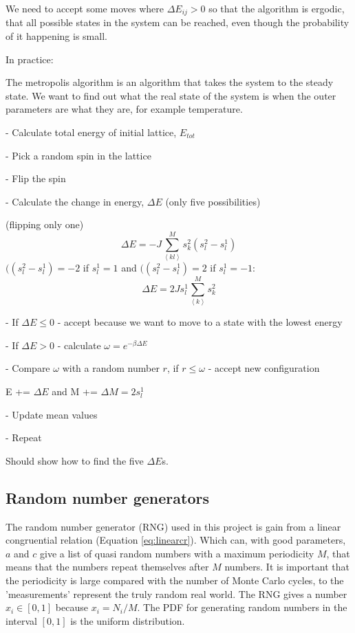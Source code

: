 We need to accept some moves where $\Delta E_{ij} > 0$ so that the algorithm is ergodic, that all possible states in the system can be reached, even though the probability of it happening is small.

In practice:

The metropolis algorithm is an algorithm that takes the system to the steady state. We want to find out what the real state of the system is when the outer parameters are what they are, for example temperature.

- Calculate total energy of initial lattice, $E_{tot}$

- Pick a random spin in the lattice

- Flip the spin

- Calculate the change in energy, $\Delta E$ (only five possibilities)

    
    (flipping only one)
    $$ \Delta E = -J\sum_{\left<kl\right>}^M s^2_k \left( s_l^2-s_l^1\right)$$
    $(\left( s_l^2-s_l^1\right) = -2$  if $s_l^1 = 1$ and $(\left( s_l^2-s_l^1\right) = 2$  if $s_l^1 = -1$:
    $$ \Delta E = 2Js_l^1\sum_{\left<k\right>}^M s^2_k$$

- If $\Delta E \leq 0$ - accept because we want to move to a state with the lowest energy

- If $\Delta E > 0$ - calculate $\omega = e^{-\beta \Delta E}$

- Compare $\omega$ with a random number $r$, if $r \leq \omega$ - accept new configuration
    
    E += $\Delta E$ and 
    M += $\Delta M = 2s_l^1$

- Update mean values

- Repeat  

Should show how to find the five $\Delta E$s.


\subsection{Random number generators}

The random number generator (RNG) used in this project is gain from a linear congruential relation (Equation \ref{eq:linearcr}). Which can, with good parameters, $a$ and $c$ give a list of quasi random numbers with a maximum periodicity $M$, that means that the numbers repeat themselves after $M$ numbers. It is important that the periodicity is large compared with the number of Monte Carlo cycles, to the 'measurements' represent the truly random real world. The RNG gives a number $x_i \in [0,1]$ because $x_i = N_i/M$. The PDF for generating random numbers in the interval $[0,1]$ is the uniform distribution.

